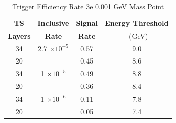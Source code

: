 \begin{table}
 \centering
\caption{Trigger Efficiency Rate 3e 0.001 GeV Mass Point}
\begin{tabular}{ c | c | c | c }
\textbf{TS} & \textbf{Inclusive} & \textbf{Signal} & \textbf{Energy Threshold}  \\ \textbf{Layers} & \textbf{Rate} & \textbf{Rate} & \ (GeV) \\ 
\hline
34 & 2.7 $\times 10^{-5}$ & 0.57 & 9.0 \\ 
20 & & 0.45 & 8.6 \\ 
\hline 
34 & 1 $\times 10^{-5}$ & 0.49 & 8.8 \\ 
20 & & 0.36 & 8.4 \\ 
\hline 
34 & 1 $\times 10^{-6}$ & 0.11 & 7.8 \\ 
20 & & 0.05 & 7.4 \\ 
\hline 
\end{tabular}
\end{table}
